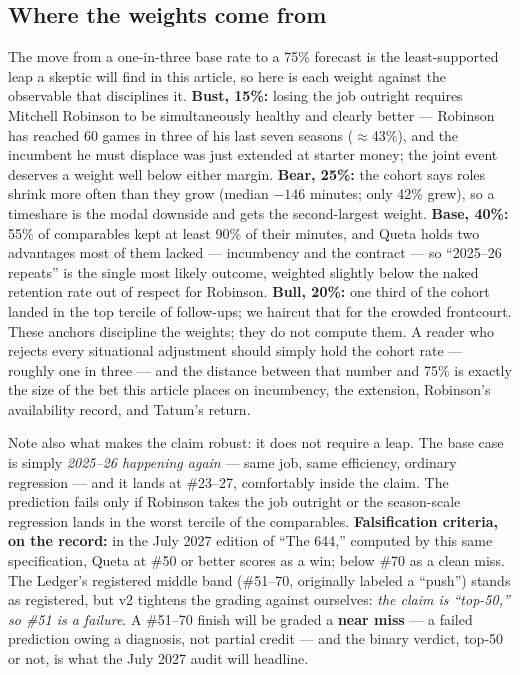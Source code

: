 \documentclass[11pt]{article}
\begin{document}
\subsection*{Where the weights come from}

The move from a one-in-three base rate to a 75\% forecast is the least-supported leap a
skeptic will find in this article, so here is each weight against the observable that
disciplines it. \textbf{Bust, 15\%:} losing the job outright requires Mitchell Robinson
to be simultaneously healthy and clearly better --- Robinson has reached 60 games in
three of his last seven seasons ($\approx$43\%), and the incumbent he must displace was
just extended at starter money; the joint event deserves a weight well below either
margin. \textbf{Bear, 25\%:} the cohort says roles shrink more often than they grow
(median $-146$ minutes; only 42\% grew), so a timeshare is the modal downside and gets
the second-largest weight. \textbf{Base, 40\%:} 55\% of comparables kept at least 90\%
of their minutes, and Queta holds two advantages most of them lacked --- incumbency and
the contract --- so ``2025--26 repeats'' is the single most likely outcome, weighted
slightly below the naked retention rate out of respect for Robinson. \textbf{Bull,
20\%:} one third of the cohort landed in the top tercile of follow-ups; we haircut that
for the crowded frontcourt. These anchors discipline the weights; they do not compute
them. A reader who rejects every situational adjustment should simply hold the cohort
rate --- roughly one in three --- and the distance between that number and 75\% is
exactly the size of the bet this article places on incumbency, the extension, Robinson's
availability record, and Tatum's return.

Note also what makes the claim robust: it does not require a leap. The base case is
simply \emph{2025--26 happening again} --- same job, same efficiency, ordinary
regression --- and it lands at \#23--27, comfortably inside the claim. The prediction
fails only if Robinson takes the job outright or the season-scale regression lands in
the worst tercile of the comparables. \textbf{Falsification criteria, on the record:}
in the July 2027 edition of ``The 644,'' computed by this same specification, Queta at
\#50 or better scores as a win; below \#70 as a clean miss. The Ledger's registered
middle band (\#51--70, originally labeled a ``push'') stands as registered, but v2
tightens the grading against ourselves: \emph{the claim is ``top-50,'' so \#51 is a
failure}. A \#51--70 finish will be graded a \textbf{near miss} --- a failed prediction
owing a diagnosis, not partial credit --- and the binary verdict, top-50 or not, is
what the July 2027 audit will headline.
\end{document}
